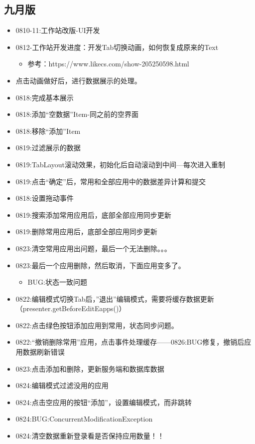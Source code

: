 \documentclass{ctexart}
\begin{document}
	\subsection{九月版}
	\begin{itemize}
		\item 0810-11:工作站改版-UI开发
		\item 0812-工作站开发进度：开发Tab切换动画，如何恢复成原来的Text
		\begin{itemize}
			\item 参考：https://www.likecs.com/show-205250598.html
		\end{itemize}
		\item 点击动画做好后，进行数据展示的处理。
		\item 0818:完成基本展示
		\item 0818:添加“空数据”Item-同之前的空界面
		\item 0818:移除“添加”Item
		\item 0819:过滤展示的数据
		\item 0819:TabLayout滚动效果，初始化后自动滚动到中间—每次进入重制
		\item 0819:点击“确定”后，常用和全部应用中的数据差异计算和提交
		\item 0818:设置拖动事件
		\item 0819:搜索添加常用应用后，底部全部应用同步更新
		\item 0819:删除常用应用后，底部全部应用同步更新
		\item 0823:清空常用应用出问题，最后一个无法删除。。。
		\item 0823:最后一个应用删除，然后取消，下面应用变多了。
		\begin{itemize}
			\item BUG:状态一致问题
		\end{itemize}
		\item 0822:编辑模式切换Tab后，”退出”编辑模式，需要将缓存数据更新（presenter.getBeforeEditEapps()）
		\item 0822:点击绿色按钮添加应用到常用，状态同步问题。
		\item 0822:“撤销删除常用”应用，点击事件处理缓存——0826:BUG修复，撤销后应用数据刷新错误
		\item 0823:点击添加和删除，更新服务端和数据库数据
		\item 0824:编辑模式过滤没用的应用
		\item 0824:点击空应用的按钮“添加”，设置编辑模式，而非跳转
		\item 0824:BUG:ConcurrentModificationException
		\item 0824:清空数据重新登录看是否保持应用数量！！

\end{itemize}
\end{document}
